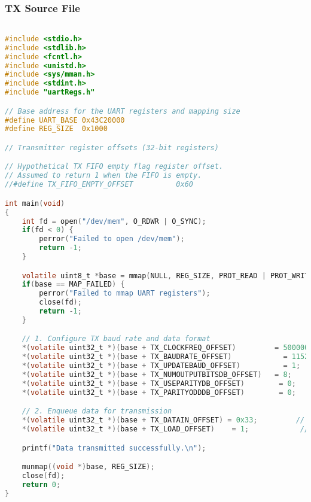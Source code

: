 \subsubsection{TX Source File}
\begin{lstlisting}[language=C,frame=single,label={lst:tx-source}]

#include <stdio.h>
#include <stdlib.h>
#include <fcntl.h>
#include <unistd.h>
#include <sys/mman.h>
#include <stdint.h>
#include "uartRegs.h"

// Base address for the UART registers and mapping size
#define UART_BASE 0x43C20000
#define REG_SIZE  0x1000

// Transmitter register offsets (32-bit registers)

// Hypothetical TX FIFO empty flag register offset.
// Assumed to return 1 when the FIFO is empty.
//#define TX_FIFO_EMPTY_OFFSET          0x60

int main(void)
{
    int fd = open("/dev/mem", O_RDWR | O_SYNC);
    if(fd < 0) {
        perror("Failed to open /dev/mem");
        return -1;
    }

    volatile uint8_t *base = mmap(NULL, REG_SIZE, PROT_READ | PROT_WRITE, MAP_SHARED, fd, UART_BASE);
    if(base == MAP_FAILED) {
        perror("Failed to mmap UART registers");
        close(fd);
        return -1;
    }

    // 1. Configure TX baud rate and data format
    *(volatile uint32_t *)(base + TX_CLOCKFREQ_OFFSET)         = 50000000;  // Set TX system clock frequency to 25 MHz
    *(volatile uint32_t *)(base + TX_BAUDRATE_OFFSET)            = 115200;    // Set desired baud rate to 115200
    *(volatile uint32_t *)(base + TX_UPDATEBAUD_OFFSET)          = 1;         // Trigger TX baud rate update
    *(volatile uint32_t *)(base + TX_NUMOUTPUTBITSDB_OFFSET)   = 8;         // Configure for 8 data bits per frame
    *(volatile uint32_t *)(base + TX_USEPARITYDB_OFFSET)        = 0;         // Disable parity
    *(volatile uint32_t *)(base + TX_PARITYODDDB_OFFSET)        = 0;         // (Ignored if parity is disabled)

    // 2. Enqueue data for transmission
    *(volatile uint32_t *)(base + TX_DATAIN_OFFSET) = 0x33;         // Write data word (0x55)
    *(volatile uint32_t *)(base + TX_LOAD_OFFSET)    = 1;            // Pulse 'load' to push data into TX FIFO

    printf("Data transmitted successfully.\n");

    munmap((void *)base, REG_SIZE);
    close(fd);
    return 0;
}
\end{lstlisting}

